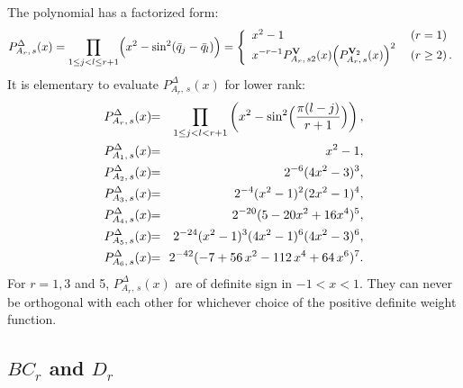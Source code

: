 \documentclass[a4paper,12pt]{article}
\begin{document}
The polynomial has a factorized form:
\begin{equation}
   P_{A_r,\,s}^{\Delta}(x)=
   \prod_{1\leq j<l\leq r+1}\Bigl(x^2-\sin^2(\bar{q}_j-\bar{q}_l)\Bigr)
   =\left\{\begin{array}{ll}
    x^2-1&\;(r=1)\\
    {\displaystyle
    x^{-r-1}P_{A_r,\,s2}^{{\bf V}}(x)\Bigl(P_{A_r,\,s}^{{\bf V}_2}(x)\Bigr)^2}
    &\;(r\geq 2)\,.
   \end{array}\right.
\end{equation}
It is elementary to evaluate $P_{A_r,\,s}^{\Delta}(x)$ for lower rank:
\begin{eqnarray*}
   P_{A_r,\,s}^{\Delta}(x)&\!\!=\!\!&\prod_{1\leq j<l<r+1}
   \left(x^2-\sin^2\Bigl({\pi(l-j)\over{r+1}}\Bigr)\right),\\
   P_{A_1,\,s}^{\Delta}(x)&\!\!=\!\!&x^2-1,\\
   P_{A_2,\,s}^{\Delta}(x)&\!\!=\!\!&2^{-6}(4x^2-3)^3,\\
   P_{A_3,\,s}^{\Delta}(x)&\!\!=\!\!&2^{-4}(x^2-1)^2(2x^2-1)^4,\\
   P_{A_4,\,s}^{\Delta}(x)&\!\!=\!\!&2^{-20}(5-20x^2+16x^4)^5,\\
   P_{A_5,\,s}^{\Delta}(x)&\!\!=\!\!&2^{-24}(x^2-1)^3(4x^2-1)^6(4x^2-3)^6,\\
   P_{A_6,\,s}^{\Delta}(x)&\!\!=\!\!&
   2^{-42}(-7 + 56\,x^2 - 112\,x^4 + 64\,x^6 )^7.
\end{eqnarray*}
For $r=1,3$ and 5, $P_{A_r,\,s}^{\Delta}(x)$ are of definite sign
in $-1< x<1$. They can never be orthogonal with each other for whichever
choice of the positive definite weight function.

\subsection{$BC_r$ and $D_r$}
\end{document}
